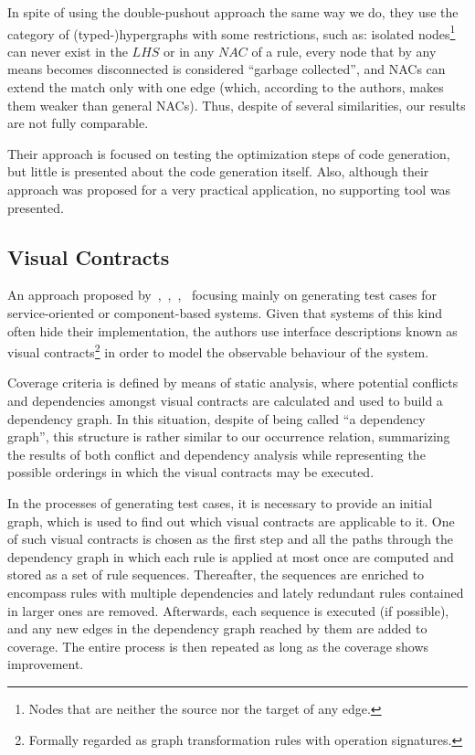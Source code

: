 In spite of using the double-pushout approach the same way we do, they use the category of (typed-)hypergraphs with some restrictions, such as: isolated nodes\footnote{ Nodes that are neither the source nor the target of any edge.} can never exist in the $LHS$ or in any $NAC$ of a rule, every node that by any means becomes disconnected is considered ``garbage collected'', and NACs can extend the match only with one edge (which, according to the authors, makes them weaker than general NACs).
Thus, despite of several similarities, our results are not fully comparable.

Their approach is focused on testing the optimization steps of code generation, but little is presented about the code generation itself. Also, although their approach was proposed for a very practical application, no supporting tool was presented.



\subsection{Visual Contracts}

  An approach proposed by~\cite{Heckel2011},~\cite{Khan2012},~\cite{Khan2012a},~\cite{Runge2013} focusing mainly on generating test cases for service-oriented or component-based systems.
  Given that systems of this kind often hide their implementation, the authors use interface descriptions known as visual contracts\footnote{ Formally regarded as graph transformation rules with operation signatures.} in order to model the observable behaviour of the system.

Coverage criteria is defined by means of static analysis, where potential conflicts and dependencies amongst visual contracts are calculated and used to build a dependency graph. In this situation, despite of being called ``a dependency graph'', this structure is rather similar to our occurrence relation, summarizing the results of both conflict and dependency analysis while representing the possible orderings in which the visual contracts may be executed.

In the processes of generating test cases, it is necessary to provide an initial graph, which is used to find out which visual contracts are applicable to it. One of such visual contracts is chosen as the first step and all the paths through the dependency graph in which each rule is applied at most once are computed and stored as a set of rule sequences. Thereafter, the sequences are enriched to encompass rules with multiple dependencies and lately redundant rules contained in larger ones are
removed. Afterwards, each sequence is executed (if possible), and any new edges in the dependency graph reached by them are added to coverage. The entire process is then repeated as long as the coverage shows improvement.

